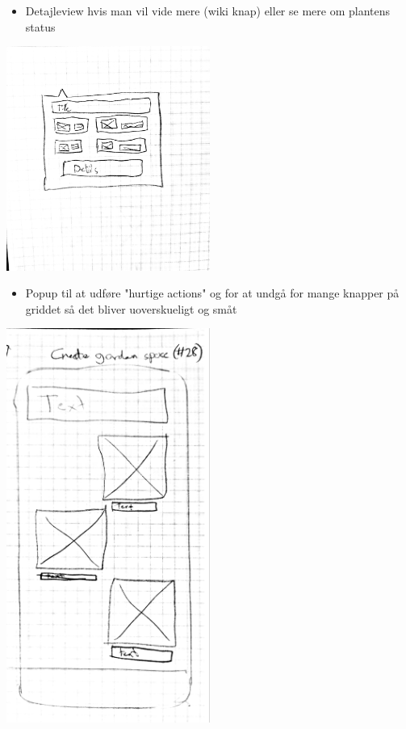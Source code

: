 \begin{itemize}
    \item Detajleview hvis man vil vide mere (wiki knap) eller se mere om plantens status
\end{itemize}

\includegraphics[width=0.5\textwidth]{img/s1-6.jpg}\\

\begin{itemize}
    \item Popup til at udføre "hurtige actions" og for at undgå for mange knapper på griddet så det bliver uoverskueligt og småt
\end{itemize}

\includegraphics[width=0.5\textwidth]{img/s1-10.jpg}\\


